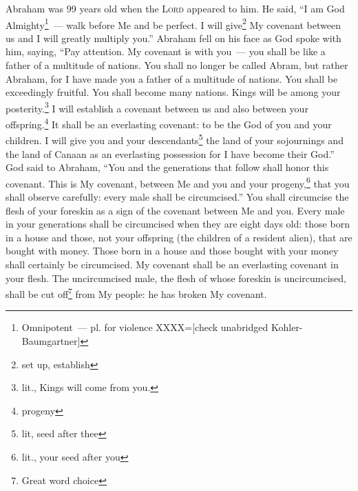 


\begin{enumerate*}[mode=unboxed]
     Abraham was 99 years old when the \textsc{Lord} appeared to him. He said, ``I am God Almighty\footnote{Omnipotent~--- pl. for violence XXXX=[check unabridged Kohler-Baumgartner]}~--- walk before Me and be perfect.%
     I will give\footnote{set up, establish} My covenant between us and I will greatly multiply you.''%
     Abraham fell on his face as God spoke with him, saying,%
     ``Pay attention. My covenant is with you~--- you shall be like a father of a multitude of nations.%
     You shall no longer be called Abram, but rather Abraham, for I have made you a father of a multitude of nations.%
     You shall be exceedingly fruitful. You shall become many nations. Kings will be among your posterity.\footnote{lit., Kings will come from you.}%
     I will establish a covenant between us and also between your offspring.\footnote{progeny} It shall be an everlasting covenant: to be the God of you and your children.%
     I will give you and your descendants\footnote{lit, seed after thee} the land of your sojournings and the land of Canaan as an everlasting possession for I have become their God.''%
     God said to Abraham, ``You and the generations that follow shall honor this covenant.%
     This is My covenant, between Me and you and your progeny,\footnote{lit., your seed after you} that you shall observe carefully: every male shall be circumcised.''%
     You shall circumcise the flesh of your foreskin as a sign of the covenant between Me and you.%
     Every male in your generations shall be circumcised when they are eight days old: those born in a house and those, not your offspring (the children of a resident alien), that are bought with money.%
     Those born in a house and those bought with your money shall certainly be circumcised. My covenant shall be an everlasting covenant in your flesh.%
     The uncircumcised male, the flesh of whose foreskin is uncircumcised, shall be cut off\footnote{Great word choice} from My people: he has broken My covenant.%

\end{enumerate*}
